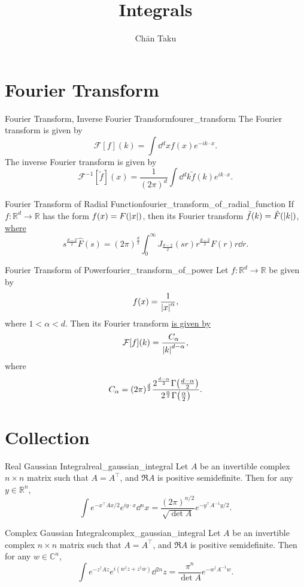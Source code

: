 \documentclass{article}
\title{Integrals}
\author{Ch\=an Taku}
\begin{document}
\maketitle

\section{Fourier Transform}

\begin{definition}{Fourier Transform, Inverse Fourier Transform}{fourer_transform}
    The Fourier transform is given by
    \[ \mathcal{F}[f](k) = \int \dd{^d x} f(x) e^{-ik\cdot x}. \]
    The inverse Fourier transform is given by
    \[ \mathcal{F}^{-1}[\tilde{f}](x) = \frac{1}{(2\pi)^d} \int \dd{^d k} \tilde{f}(k) e^{ik\cdot x}. \]
\end{definition}

\begin{theorem}{Fourier Transform of Radial Function}{fourier_transform_of_radial_function}
    If $f: \mathbb{R}^d \rightarrow \mathbb{R}$ has the form $f(x) = F(\abs{x})$, then its Fourier transform $\tilde{f}(k) = \hat{F}(\abs{k})$, \href{https://www.math.arizona.edu/~faris/methodsweb/hankel.pdf}{where}
    \[ s^{\frac{d-2}{2}} \hat{F}(s) = (2\pi)^{\frac{d}{2}} \int_0^\infty J_{\frac{d-2}{2}}(sr) r^{\frac{d-2}{2}} F(r) r \dd{r}. \]
\end{theorem}

\begin{theorem}{Fourier Transform of Power}{fourier_transform_of_power}
    Let $f:\mathbb{R}^d \rightarrow \mathbb{R}$ be given by
    \[ f(x) = \frac{1}{\abs{x}^\alpha}, \]
    where $1 < \alpha < d$.
    Then its Fourier transform \href{https://www.math.arizona.edu/~faris/methodsweb/hankel.pdf}{is given by}
    \[ \mathcal{F}[f](k) = \frac{C_\alpha}{\abs{k}^{d-\alpha}}, \]
    where
    \[ C_\alpha = (2\pi)^{\frac{d}{2}} \frac{2^{\frac{d-\alpha}{2}}\Gamma\qty(\frac{d-\alpha}{2})}{2^{\frac{\alpha}{2}}\Gamma\qty(\frac{\alpha}{2})}. \]
\end{theorem}

\section{Collection}

\begin{theorem}{Real Gaussian Integral}{real_gaussian_integral}
    Let $A$ be an invertible complex $n\times n$ matrix such that $A=A^\intercal$,
    and $\Re A$ is positive semidefinite.
    Then for any $y\in \mathbb{R}^n$,
    \[ \int e^{-x^\intercal A x / 2} e^{iy\cdot x} \dd{^n x} = \frac{(2\pi)^{n/2}}{\sqrt{\det A}} e^{-y^\intercal A^{-1} y/2}. \]
\end{theorem}

\begin{theorem}{Complex Gaussian Integral}{complex_gaussian_integral}
    Let $A$ be an invertible complex $n\times n$ matrix such that $A=A^\intercal$,
    and $\Re A$ is positive semidefinite.
    Then for any $w\in \mathbb{C}^n$,
    \[ \int e^{-z^\dagger A z} e^{i(w^\dagger z + z^\dagger w)} \dd{^{2n} z} = \frac{\pi^n}{\det A} e^{-w^\dagger A^{-1} w}. \]
\end{theorem}
\end{document}
